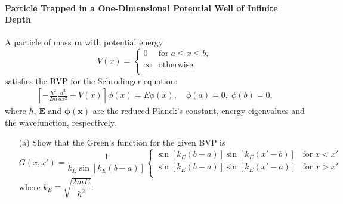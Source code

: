 \documentclass{article}
\begin{document}
{	\paragraph{Particle Trapped in a One-Dimensional Potential Well of Infinite Depth} A particle of mass $\bm{m}$ with potential energy
	\begin{equation*}
		V(x) =
		\begin{cases}
			0 & \text{for} \; a \leq x \leq b, \\
			\infty & \text{otherwise}, \\
		\end{cases}
	\end{equation*}
	satisfies the BVP for the Schrodinger equation:
	\begin{equation*}
		\begin{split}
			\left[ -\frac{\hbar^2}{2m} \frac{d^2}{dx^2} + V(x) \right] \phi(x) = E\phi(x), \quad \phi(a) = 0, \; \phi(b) = 0,
		\end{split}
	\end{equation*}
	where $\bm{\hbar}$, $\bm{E}$ and $\bm{\phi(x)}$ are the reduced Planck's constant, energy eigenvalues and the wavefunction, respectively.
	\\
	\begin{enumerate}
		\item[(a)] Show that the Green's function for the given BVP is
		\begin{equation*}
			G(x,x') = \frac{1}{k_E \sin \left[ k_E (b - a) \right]}
			\begin{cases}
				\sin \left[ k_E (b - a) \right] \sin \left[ k_E (x' - b) \right] & \text{for} \; x < x' \\
				\sin \left[ k_E (b - a) \right] \sin \left[ k_E (x' - a) \right] & \text{for} \; x > x' \\
			\end{cases}
		\end{equation*}
		where $k_E \equiv \sqrt{\dfrac{2mE}{\hbar^2}}$.

\end{enumerate}}
\end{document}
